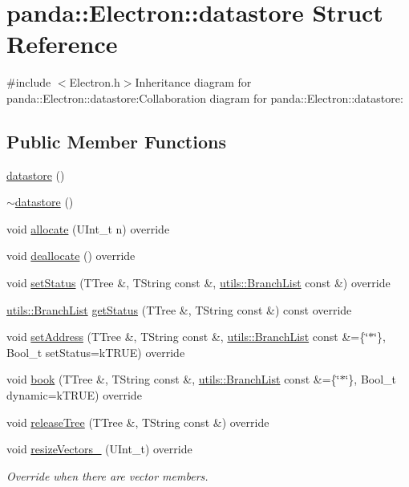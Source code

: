 \hypertarget{structpanda_1_1Electron_1_1datastore}{
\section{panda::Electron::datastore Struct Reference}
\label{structpanda_1_1Electron_1_1datastore}
}


{\ttfamily \#include $<$Electron.h$>$}Inheritance diagram for panda::Electron::datastore:Collaboration diagram for panda::Electron::datastore:\subsection*{Public Member Functions}
\begin{DoxyCompactItemize}
\item 
\hyperlink{structpanda_1_1Electron_1_1datastore_a2be5528c91b18d47c8c277a4f21ca899}{datastore} ()
\item 
\hyperlink{structpanda_1_1Electron_1_1datastore_af9dfc2f8a0fca924c40cc0d488f6bb02}{$\sim$datastore} ()
\item 
void \hyperlink{structpanda_1_1Electron_1_1datastore_a3e84b684132c59a589f7a041cae61507}{allocate} (UInt\_\-t n) override
\item 
void \hyperlink{structpanda_1_1Electron_1_1datastore_a82e74b804ecc9c1a138d5c3fcd6ef3a3}{deallocate} () override
\item 
void \hyperlink{structpanda_1_1Electron_1_1datastore_af2c384514f539bcc78e55284b7eb3b67}{setStatus} (TTree \&, TString const \&, \hyperlink{classpanda_1_1utils_1_1BranchList}{utils::BranchList} const \&) override
\item 
\hyperlink{classpanda_1_1utils_1_1BranchList}{utils::BranchList} \hyperlink{structpanda_1_1Electron_1_1datastore_aca8cd939bbe2edf7b152348364b1ac4c}{getStatus} (TTree \&, TString const \&) const override
\item 
void \hyperlink{structpanda_1_1Electron_1_1datastore_a71a4b440953afe1b0252d462753b74f1}{setAddress} (TTree \&, TString const \&, \hyperlink{classpanda_1_1utils_1_1BranchList}{utils::BranchList} const \&=\{\char`\"{}$\ast$\char`\"{}\}, Bool\_\-t setStatus=kTRUE) override
\item 
void \hyperlink{structpanda_1_1Electron_1_1datastore_aa22730e40dda69219e7dac203220dcae}{book} (TTree \&, TString const \&, \hyperlink{classpanda_1_1utils_1_1BranchList}{utils::BranchList} const \&=\{\char`\"{}$\ast$\char`\"{}\}, Bool\_\-t dynamic=kTRUE) override
\item 
void \hyperlink{structpanda_1_1Electron_1_1datastore_acd47db6bdd5b2308f4f1b02a9b1bd97f}{releaseTree} (TTree \&, TString const \&) override
\item 
void \hyperlink{structpanda_1_1Electron_1_1datastore_a8f0e7ee31635f5cf7482c86b732877a2}{resizeVectors\_\-} (UInt\_\-t) override
\begin{DoxyCompactList}\small\item\em Override when there are vector members. \item\end{DoxyCompactList}\end{DoxyCompactItemize}


